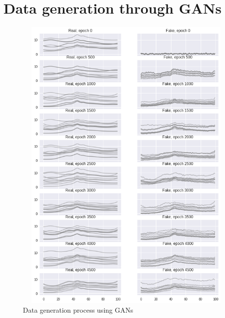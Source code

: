 \chapter{Data generation through GANs}
\begin{figure}[ht]
\begin{center}
\includegraphics[width=17cm,height=15cm,keepaspectratio]{images/GAN_train.png}
\caption{Data generation process using GANs}
\label{fig:GANs train augmentation}
\end{center}
\end{figure}


